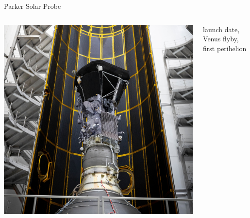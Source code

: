 \begin{frame}[c]{Parker Solar Probe}{}
	\begin{columns}[c]
		
		\includegraphics[width=\textwidth]{../figures_of_others/images/PSP_fencap2_square.jpg}


		launch date, Venus flyby, first perihelion
	\end{columns}
\end{frame}

